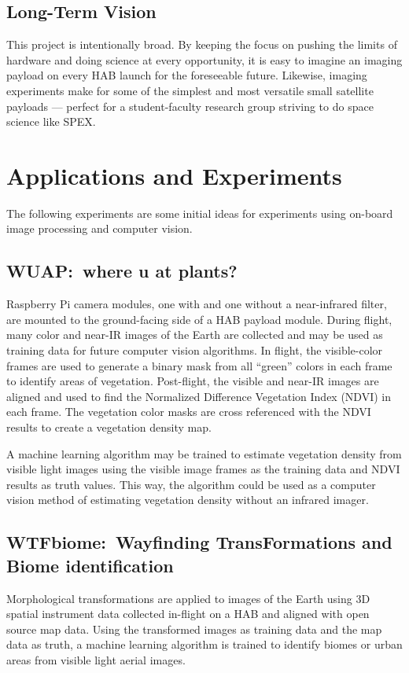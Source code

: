 \documentclass[conference]{IEEEtran} %
\begin{document}
\subsection{Long-Term Vision}
\label{sec:vision}
This project is intentionally broad.
By keeping the focus on pushing the limits of hardware and doing science at every opportunity, it is easy to imagine an imaging payload on every HAB launch for the foreseeable future.
Likewise, imaging experiments make for some of the simplest and most versatile small satellite payloads --- perfect for a student-faculty research group striving to do space science like SPEX.\@

\section{Applications and Experiments}
\label{sec:payloads}
The following experiments are some initial ideas for experiments using on-board image processing and computer vision.

\subsection{WUAP:~where u at plants?}
\label{subsec:wuap}
Raspberry Pi camera modules, one with and one without a near-infrared filter, are mounted to the ground-facing side of a HAB payload module.
During flight, many color and near-IR images of the Earth are collected and may be used as training data for future computer vision algorithms.
In flight, the visible-color frames are used to generate a binary mask from all ``green'' colors in each frame to identify areas of vegetation.
Post-flight, the visible and near-IR images are aligned and used to find the Normalized Difference Vegetation Index (NDVI)\cite{nasa:ndvi} in each frame.
The vegetation color masks are cross referenced with the NDVI results to create a vegetation density map.

A machine learning algorithm may be trained to estimate vegetation density from visible light images using the visible image frames as the training data and NDVI results as truth values.
This way, the algorithm could be used as a computer vision method of estimating vegetation density without an infrared imager.

\subsection{WTFbiome:~Wayfinding TransFormations and Biome identification}
\label{subsec:wtfbiome}
Morphological transformations are applied to images of the Earth using 3D spatial instrument data collected in-flight on a HAB and aligned with open source map data.
Using the transformed images as training data and the map data as truth, a machine learning algorithm is trained to identify biomes or urban areas from visible light aerial images.
\end{document}
